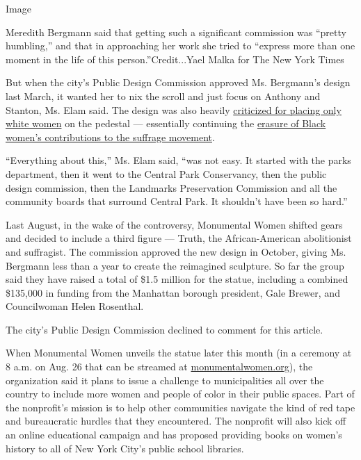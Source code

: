 Image

Meredith Bergmann said that getting such a significant commission was
``pretty humbling,'' and that in approaching her work she tried to
``express more than one moment in the life of this
person.''Credit...Yael Malka for The New York Times

But when the city's Public Design Commission approved Ms. Bergmann's
design last March, it wanted her to nix the scroll and just focus on
Anthony and Stanton, Ms. Elam said. The design was also heavily
\href{https://www.nytimes.com/2019/01/17/nyregion/is-a-planned-monument-to-womens-rights-racist.html}{criticized
for placing only white women} on the pedestal --- essentially continuing
the
\href{https://www.nytimes.com/2019/05/14/opinion/central-park-suffrage-monument-racism.html}{erasure
of Black women's contributions to the suffrage movement}.

``Everything about this,'' Ms. Elam said, ``was not easy. It started
with the parks department, then it went to the Central Park Conservancy,
then the public design commission, then the Landmarks Preservation
Commission and all the community boards that surround Central Park. It
shouldn't have been so hard.''

Last August, in the wake of the controversy, Monumental Women shifted
gears and decided to include a third figure --- Truth, the
African-American abolitionist and suffragist. The commission approved
the new design in October, giving Ms. Bergmann less than a year to
create the reimagined sculpture. So far the group said they have raised
a total of \$1.5 million for the statue, including a combined \$135,000
in funding from the Manhattan borough president, Gale Brewer, and
Councilwoman Helen Rosenthal.

The city's Public Design Commission declined to comment for this
article.

When Monumental Women unveils the statue later this month (in a ceremony
at 8 a.m. on Aug. 26 that can be streamed at
\href{http://monumentalwomen.org/}{monumentalwomen.org}), the
organization said it plans to issue a challenge to municipalities all
over the country to include more women and people of color in their
public spaces. Part of the nonprofit's mission is to help other
communities navigate the kind of red tape and bureaucratic hurdles that
they encountered. The nonprofit will also kick off an online educational
campaign and has proposed providing books on women's history to all of
New York City's public school libraries.

